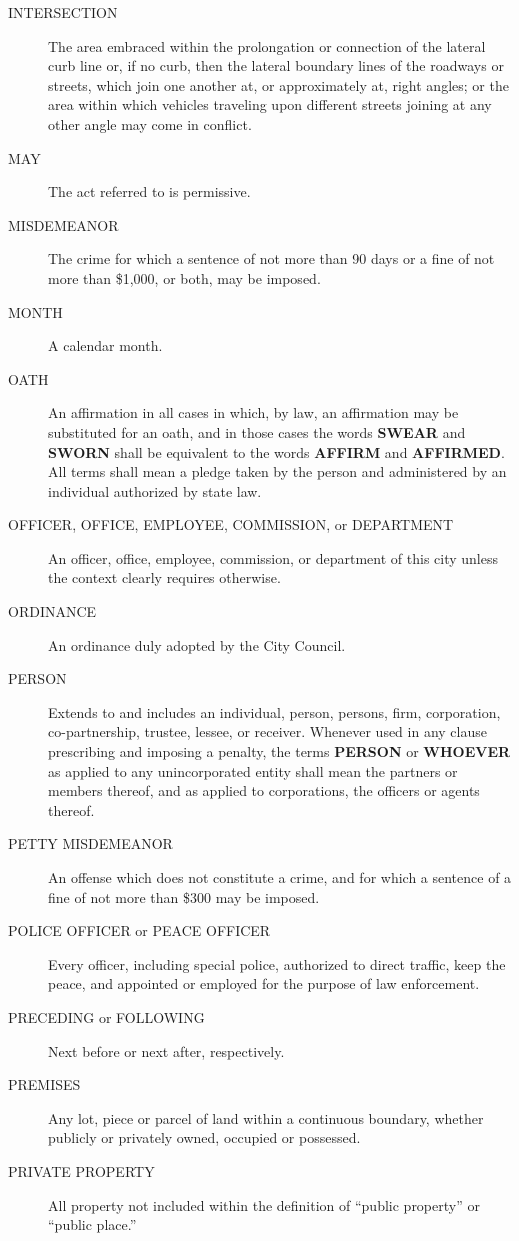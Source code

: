 \begin{description}
\item[INTERSECTION] The area embraced within the prolongation or connection of the lateral curb line or, if no curb, then the lateral boundary lines of the roadways or streets, which join one another at, or approximately at, right angles; or the area within which vehicles traveling upon different streets joining at any other angle may come in conflict.
\item[MAY] The act referred to is permissive.
\item[MISDEMEANOR] The crime for which a sentence of not more than 90 days or a fine of not more than \$1,000, or both, may be imposed.
\item[MONTH] A calendar month.
\item[OATH] An affirmation in all cases in which, by law, an affirmation may be substituted for an oath, and in those cases the words \textbf{SWEAR} and \textbf{SWORN} shall be equivalent to the words \textbf{AFFIRM} and \textbf{AFFIRMED}.  All terms shall mean a pledge taken by the person and administered by an individual authorized by state law.
\item[OFFICER, OFFICE, EMPLOYEE, COMMISSION, or DEPARTMENT] An officer, office, employee, commission, or department of this city unless the context clearly requires otherwise.
\item[ORDINANCE] An ordinance duly adopted by the City Council.
\item[PERSON] Extends to and includes an individual, person, persons, firm, corporation, co-partnership, trustee, lessee, or receiver.  Whenever used in any clause prescribing and imposing a penalty, the terms \textbf{PERSON} or \textbf{WHOEVER} as applied to any unincorporated entity shall mean the partners or members thereof, and as applied to corporations, the officers or agents thereof.
\item[PETTY MISDEMEANOR] An offense which does not constitute a crime, and for which a sentence of a fine of not more than \$300 may be imposed.
\item[POLICE OFFICER or PEACE OFFICER] Every officer, including special police, authorized to direct traffic, keep the peace, and appointed or employed for the purpose of law enforcement.
\item[PRECEDING or FOLLOWING] Next before or next after, respectively.
\item[PREMISES] Any lot, piece or parcel of land within a continuous boundary, whether publicly or privately owned, occupied or possessed.
\item[PRIVATE PROPERTY] All property not included within the definition of “public property” or “public place.”

\end{description}
